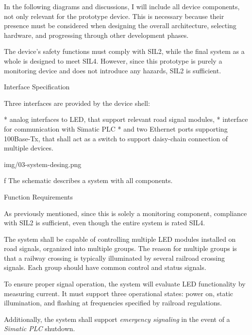 In the following diagrams and discussions, I will include all device components, not only relevant for the prototype device. This is necessary because their presence must be considered when designing the overall architecture, selecting hardware, and progressing through other development phases.

The device's safety functions must comply with SIL2, while the final system as a whole is designed to meet SIL4. However, since this prototype is purely a monitoring device and does not introduce any hazards, SIL2 is sufficient.

\secc Interface Specification

Three interfaces are provided by the device shell:

\begitems
* {\sbf analog interfaces} to LED, that support relevant road signal modules,
* interface for {\sbf communication with Simatic PLC}
* and {\sbf two Ethernet ports} supporting 100Base-Tx, that shall act as a switch to support daisy-chain connection of multiple devices.
\enditems

\medskip
{}
\picw=12cm \cinspic img/03-system-desing.png
\caption/f The schematic describes a system with all components.
\medskip

\secc Function Requirements

As previously mentioned, since this is solely a monitoring component, compliance with SIL2 is sufficient, even though the entire system is rated SIL4. 

The system shall be capable of controlling multiple LED modules installed on road signals, organized into multiple groups. The reason for multiple groups is that a railway crossing is typically illuminated by several railroad crossing signals. Each group should have common control and status signals.

To ensure proper signal operation, the system will evaluate LED functionality by measuring current. It must support three operational states: power on, static illumination, and flashing at frequencies specified by railroad regulations.  

Additionally, the system shall support {\it emergency signaling} in the event of a {\it Simatic PLC} shutdown.

